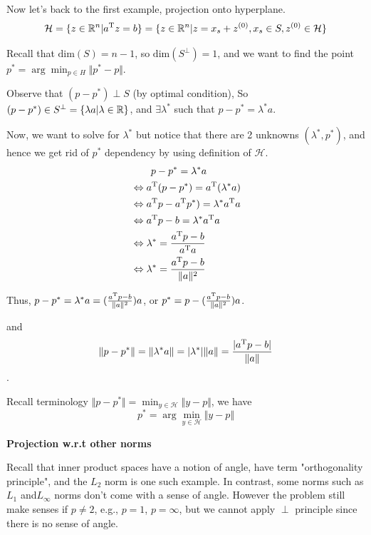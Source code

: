 \vspace{0.3cm}
Now let's back to the first example, projection onto hyperplane.
$$\mathcal{H}=\{z\in\mathbb{R}^{n}|a^{{\rm T}} z=b\}=\{z\in\mathbb{R}^{n}|z=x_{s}+z^{(0)},x_{s}\in S, z^{(0)}\in \mathcal{H}\}$$

\begin{figure}
	\centering
	\resizebox{7.5cm}{3cm}{}
	\caption{}
	\label{}
\end{figure}

Recall that $\text{dim}(S)=n-1$, so $\text{dim}(S^{\perp})=1$, and we want to find the point $p^{*}=\arg \min_{p\in H} \Vert p^{*}-p\Vert$.

Observe that $(p-p^{*}) \perp S$ (by optimal condition), So $(p-p^{*}) \in S^{\perp}=\{\lambda a|\lambda \in \mathbb{R} \}$, and $\exists \lambda^{*}$ such that $p-p^{*}=\lambda^{*}a$.

Now, we want to solve for $\lambda^{*}$ but notice that there are 2 unknowns $(\lambda^{*},p^{*})$, and hence we get rid of $p^{*}$ dependency by using definition of $\mathcal{H}$.
\begin{align*}
&\qquad p-p^{*}=\lambda^{*}a\\
&\Leftrightarrow a^{{\rm T}} (p-p^{*})=a^{{\rm T}} (\lambda^{*}a)\\
&\Leftrightarrow a^{{\rm T}} p-a^{{\rm T}} p^{*})=\lambda^{*}a^{{\rm T}} a\\
&\Leftrightarrow a^{{\rm T}} p-b=\lambda^{*}a^{{\rm T}} a\\
&\Leftrightarrow \lambda^{*}=\frac{a^{{\rm T}} p-b}{a^{{\rm T}} a}\\
&\Leftrightarrow \lambda^{*}=\frac{a^{{\rm T}} p-b}{\Vert a\Vert^{2}}\\
\end{align*}

Thus, $p-p^{*}=\lambda^{*} a=(\frac{a^{{\rm T}} p-b}{\Vert a\Vert^{2}})a$, or $p^{*}=p-(\frac{a^{{\rm T}} p-b}{\Vert a\Vert^{2}})a$.

and 
$$\Vert p-p^{*}\Vert=\Vert \lambda^{*}a\Vert= \vert \lambda^{*}\vert \Vert a\Vert=\frac{\vert a^{{\rm T}} p-b\vert}{\Vert a\Vert}$$.

Recall terminology $\Vert p-p^{*}\Vert=\min_{y\in \mathcal{H}} \Vert y-p\Vert$, we have
$$p^{*}=\arg\min_{y\in \mathcal{H}} \Vert y-p\Vert$$


\vspace{0.5cm}
\noindent\textbf{Projection w.r.t other norms}

Recall that inner product spaces have a notion of angle, have term "orthogonality principle", and the $L_{2}$ norm is one such example. In contrast, some norms such as $L_{1}$ and$ L_{\infty}$ norms don't come with a sense of angle. However the problem still make senses if $p\neq 2$, e.g., $p=1$, $p=\infty$, but we cannot apply $\perp$ principle since there is no sense of angle.

